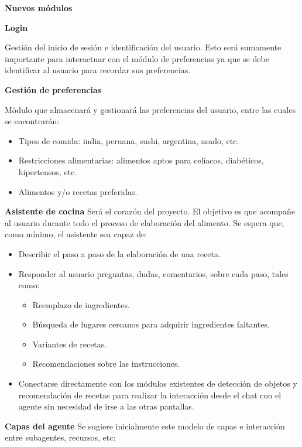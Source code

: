 \documentclass[
11pt, %
]{charter}
\begin{document}
\textbf{Nuevos módulos}

\textbf{Login}


Gestión del inicio de sesión e identificación del usuario. Esto será sumamente importante para interactuar con el módulo de preferencias ya que se debe identificar al usuario para recordar sus preferencias.


\textbf{Gestión de preferencias}


Módulo que almacenará y gestionará las preferencias del usuario, entre las cuales se encontrarán:
\begin{itemize}
    \item Tipos de comida: india, peruana, sushi, argentina, asado, etc.
    \item Restricciones alimentarias: alimentos aptos para celíacos, diabéticos, hipertensos, etc.
    \item Alimentos y/o recetas preferidas.
\end{itemize}


\textbf{Asistente de cocina}
Será el corazón del proyecto. El objetivo es que acompañe al usuario durante todo el proceso de elaboración del alimento. Se espera que, como mínimo, el asistente sea capaz de:

\begin{itemize}
    \item Describir el paso a paso de la elaboración de una receta.
    \item Responder al usuario preguntas, dudas, comentarios, sobre cada paso, tales como:
    \begin{itemize}
        \item Reemplazo de ingredientes.
        \item Búsqueda de lugares cercanos para adquirir ingredientes faltantes.
        \item Variantes de recetas.
        \item Recomendaciones sobre las instrucciones.
    \end{itemize}
    \item Conectarse directamente con los módulos existentes de detección de objetos y recomendación de recetas para realizar la interacción desde el chat con el agente sin necesidad de irse a las otras pantallas.
\end{itemize}

\textbf{Capas del agente}
Se sugiere inicialmente este modelo de capas e interacción entre subagentes, recursos, etc:
\end{document}
